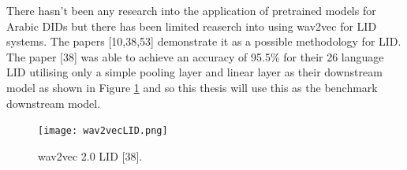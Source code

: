 There hasn't been any research into the application of pretrained models for Arabic DIDs but there has been limited reaserch into using wav2vec for LID systems. 
The papers [10,38,53] demonstrate it as a possible methodology for LID. The paper [38] was able to achieve an accuracy of 95.5\%  for their 26 language LID utilising only 
a simple pooling layer and linear layer as their downstream model as shown in Figure \ref{fig:wav2vec} and so this thesis will use this as the benchmark downstream model. 

\begin{figure}[h!]
    \centering
    \texttt{[image: wav2vecLID.png]}
    \caption{wav2vec 2.0 LID [38].}
    \label{fig:wav2vec}
\end{figure}

\begin{figure}[H]
\end{figure}

